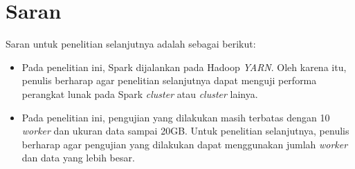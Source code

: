 \section{Saran}

Saran untuk penelitian selanjutnya adalah sebagai berikut:

\begin{itemize}

\item Pada penelitian ini, Spark dijalankan pada Hadoop \textit{YARN}. Oleh karena itu, penulis berharap agar penelitian selanjutnya dapat menguji performa perangkat lunak pada Spark \textit{cluster} atau \textit{cluster} lainya.


\item Pada penelitian ini, pengujian yang dilakukan masih terbatas dengan 10 \textit{worker} dan ukuran data sampai 20GB. Untuk penelitian selanjutnya, penulis berharap agar pengujian yang dilakukan dapat menggunakan jumlah \textit{worker} dan data yang lebih besar.

\end{itemize}